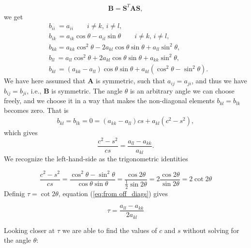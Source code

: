 \documentclass{emulateapj}
\newcommand\sini[0]{\sin{\theta}}
\newcommand\cosi[0]{\cos{\theta}}
\begin{document}
        \begin{equation*}
            \bm{B} = \bm{S}^T \bm{A} \bm{S},
        \end{equation*}
        we get 
        \begin{align*}
            &b_{ii}\; = a_{ii} \qquad i \neq k,\, i \neq l,
            \\
            &b_{ik}\, = a_{ik} \cosi - a_{il} \sini \qquad i \neq k,\, i \neq l,
            \\
            &b_{kk} = a_{kk} \cos^2\theta - 2 a_{kl} \cosi \sini + a_{ll} \sin^2\theta,
            \\
            &b_{ll}\ = a_{ll} \cos^2\theta + 2 a_{kl} \cosi \sini + a_{kk} \sin^2\theta,
            \\
            &b_{kl}\, = (a_{kk} - a_{ll}) \cosi \sini+ a_{kl}(\cos^2\theta - \sin^2\theta).
        \end{align*}
        We have here assumed that \(\bm{A}\) is symmetric, such that \(a_{ij}=a_{ji}\), and thus we have \(b_{ij}=b_{ji}\), i.e., \(\bm{B}\) is symmetric. The angle \(\theta\) is an arbitrary angle we can choose freely, and we choose it in a way that makes the non-diagonal elements \(b_{kl} = b_{lk}\) becomes zero. That is
        \begin{align*}
            b_{kl} = b_{lk} = 0 = (a_{kk} - a_{ll})cs + a_{kl}(c^2 - s^2),
        \end{align*}
        which gives
        \begin{equation}\label{eq:from off_diags}
            \dfrac{c^2 - s^2}{cs} = \dfrac{a_{ll} - a_{kk}}{a_{kl}}.
        \end{equation}
        We recognize the left-hand-side as the trigonometric identities
        
        \begin{equation*}
            \frac{c^{2}-s^{2}}{cs} = \frac{\cos^{2}\theta - \sin^{2}\theta}{\cosi\sini} = \dfrac{\cos 2\theta}{\tfrac{1}{2}\sin 2\theta} = 2\dfrac{\cos 2\theta}{\sin 2\theta} = 2 \cot 2\theta
        \end{equation*}
        Definig \(\tau=\cot 2\theta\), equation (\ref{eq:from off_diags}) gives 
        
        \begin{equation*}
            \tau = \dfrac{a_{ll} - a_{kk}}{2a_{kl}}    
        \end{equation*}
        
        Looking closer at \(\tau\) we are able to find the values of \(c\) and \(s\) without solving for the angle \(\theta\):
\end{document}

